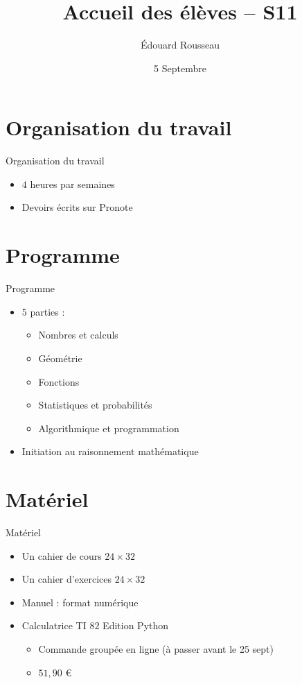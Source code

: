 \documentclass[17pt,xcolor=x11names]{beamer}
\begin{document}
\begin{frame}
  \title{Accueil des élèves -- S11}
  \author{Édouard Rousseau}
\date{5 Septembre}
\titlepage
\end{frame}

\section*{Organisation du travail}
\begin{frame}{Organisation du travail}
  \begin{itemize}
    \item $4$ heures par semaines
    \item Devoirs écrits sur Pronote
  \end{itemize}
\end{frame}
\section*{Programme}
\begin{frame}{Programme}
  \begin{itemize}
    \item $5$ parties :
      \begin{itemize}
        \item Nombres et calculs
        \item Géométrie
        \item Fonctions
        \item Statistiques et probabilités
        \item Algorithmique et programmation
      \end{itemize}
    \item Initiation au raisonnement mathématique
  \end{itemize}
\end{frame}

\section*{Matériel}
\begin{frame}{Matériel}
  \begin{itemize}
    \item Un cahier de cours $24\times32$
    \item Un cahier d'exercices $24\times32$
    \item Manuel : format numérique
    \item Calculatrice TI $82$ Edition Python \begin{itemize}
        \item Commande groupée en ligne (à passer avant le 25 sept)
        \item $51,90$ €
      \end{itemize}
  \end{itemize}
\end{frame}
\end{document}
